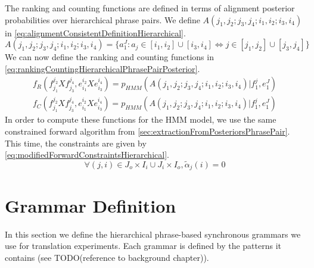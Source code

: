 The ranking and counting functions are defined in terms of alignment posterior
probabilities over hierarchical phrase pairs. We define \linebreak
$A(j_1, j_2; j_3, j_4; i_1, i_2; i_3, i_4)$ in
\autoref{eq:alignmentConsistentDefinitionHierarchical}.
%
\begin{equation}
  A(j_1, j_2; j_3, j_4; i_1, i_2; i_3, i_4) = \{a_1^J : a_j \in [i_1, i_2] \cup [i_3, i_4] \Leftrightarrow j \in [j_1, j_2] \cup [j_3, j_4] \}
  \label{eq:alignmentConsistentDefinitionHierarchical}
\end{equation}
%
We can now define the ranking and counting functions in
\autoref{eq:rankingCountingHierarchicalPhrasePairPosterior}.
%
\begin{equation}
  \begin{split}
  f_R(f_{j_1}^{j_2} X f_{j_3}^{j_4}, e_{i_1}^{i_2} X e_{i_3}^{i_4}) = p_{HMM}(A(j_1, j_2; j_3, j_4; i_1, i_2; i_3, i_4) | f_1^j, e_1^J) \\
  f_C(f_{j_1}^{j_2} X f_{j_3}^{j_4}, e_{i_1}^{i_2} X e_{i_3}^{i_4}) = p_{HMM}(A(j_1, j_2; j_3, j_4; i_1, i_2; i_3, i_4) | f_1^j, e_1^J)
  \end{split}
  \label{eq:rankingCountingHierarchicalPhrasePairPosterior}
\end{equation}
%
In order to compute these functions for the HMM model, we use the same
constrained forward algorithm from
\autoref{sec:extractionFromPosteriorsPhrasePair}. This time, the constraints
are given by \autoref{eq:modifiedForwardConstraintsHierarchical}.
%
\begin{equation}
  \forall (j, i) \in J_o \times I_i \cup J_i \times I_o , \tilde \alpha_j(i) = 0
  \label{eq:modifiedForwardConstraintsHierarchical}
\end{equation}

\section{Grammar Definition}
\label{sec:extractionFromPosteriorsGrammarDefinition}

In this section we define the hierarchical phrase-based synchronous grammars we
use for translation experiments. Each grammar is defined by the patterns it
contains (see TODO(reference to background chapter)).

